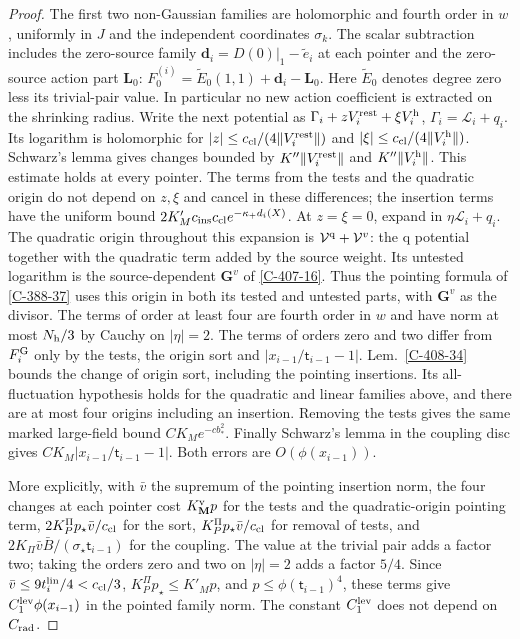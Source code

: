 \documentclass[11pt,letterpaper,reqno]{amsart}
\theoremstyle{definition}
\theoremstyle{remark}
\begin{document}
\begin{proof}
The first two non-Gaussian families are holomorphic and fourth
order in $w$, uniformly in $J$ and the independent coordinates
$\sigma_k$. The scalar subtraction includes the zero-source
family $\mathbf d_i=D(0)|_1-\widetilde e_i$ at each pointer
and the zero-source action part $\mathbf L_0$:
$F_0^{(i)}=\widetilde E_0(1,1)+\mathbf d_i-\mathbf L_0$.
Here $\widetilde E_0$ denotes degree zero less its trivial-pair
value. In particular no new action coefficient is extracted
on the shrinking radius.
Write the next potential as
$\Gamma_i+zV_i^{\rm rest}+\xi V_i^{\rm h}$,
$\Gamma_i=\mathcal L_i+q_i$.
Its logarithm is holomorphic for
$|z|\le c_{\rm cl}/(4\|V_i^{\rm rest}\|)$ and
$|\xi|\le c_{\rm cl}/(4\|V_i^{\rm h}\|)$.
Schwarz's lemma gives changes bounded by
$K''\|V_i^{\rm rest}\|$ and $K''\|V_i^{\rm h}\|$.
This estimate holds at every pointer. The terms from the tests
and the quadratic origin do not depend on $z,\xi$ and cancel
in these differences; the insertion terms have the uniform
bound $2K'_Mc_{\rm ins}c_{\rm cl}e^{-\kappa_+d_i(X)}$.
At $z=\xi=0$, expand in $\eta\mathcal L_i+q_i$.
The quadratic origin throughout this expansion is
$\mathcal V^{\rm q}+\mathcal V^v$: the q potential together
with the quadratic term added by the source weight. Its
untested logarithm is the source-dependent $\mathbf G^v$
of \cref{C-407-16}. Thus the pointing formula of
\cref{C-388-37} uses this origin in both its tested and
untested parts, with $\mathbf G^v$ as the divisor.
The terms of order at least four are fourth order in $w$ and
have norm at most $N_{\rm h}/3$ by Cauchy on $|\eta|=2$.
The terms of orders zero and two differ from $F_i^{\rm G}$
only by the tests, the origin sort and $|x_{i-1}/\mathsf t_{i-1}-1|$.
Lem.~\ref{C-408-34} bounds the change of origin sort,
including the pointing insertions. Its all-fluctuation
hypothesis holds for the quadratic and linear families above,
and there are at most four origins including an insertion.
Removing the tests gives the same marked large-field bound
$CK_Me^{-cb_*^2}$.
Finally Schwarz's lemma in the coupling disc gives
$C K_M|x_{i-1}/\mathsf t_{i-1}-1|$. Both errors are
$O(\phi(x_{i-1}))$.

More explicitly, with $\bar v$ the supremum of the pointing
insertion norm, the four changes at each pointer cost
$K_{\mathbf M}^{\rm v}p$ for the tests and the quadratic-origin
pointing term, $2K_P^\Pi p_\star\bar v/c_{\rm cl}$ for the
sort, $K_P^\Pi p_\star\bar v/c_{\rm cl}$ for removal of tests,
and $2K_\Pi\bar v\bar B/(\sigma_\star\mathsf t_{i-1})$
for the coupling. The value at the trivial pair adds a factor
two; taking the orders zero and two on $|\eta|=2$ adds a factor
$5/4$. Since $\bar v\le9t_i^{\rm lin}/4<c_{\rm cl}/3$,
$K_P^\Pi p_\star\le K'_Mp$, and
$p\le\phi(\mathsf t_{i-1})^4$, these terms give
$C_1^{\rm lev}\phi(x_{i-1})$ in the pointed family norm.
The constant $C_1^{\rm lev}$ does not depend on $C_{\rm rad}$.


\end{proof}
\end{document}
